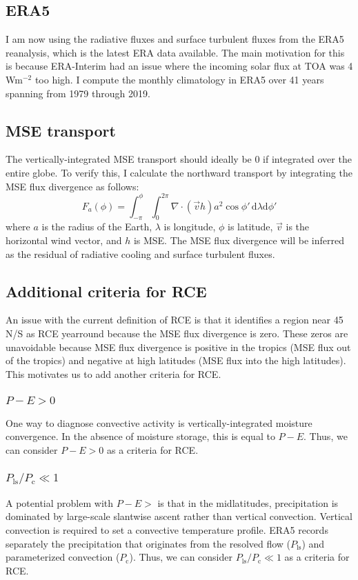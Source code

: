 \documentclass[11pt]{article}
\begin{document}
\subsection{ERA5}
\label{sec:org9002395}
I am now using the radiative fluxes and surface turbulent fluxes from the ERA5 reanalysis, which is the latest ERA data available. The main motivation for this is because ERA-Interim had an issue where the incoming solar flux at TOA was 4 Wm\(^{-2}\) too high. I compute the monthly climatology in ERA5 over 41 years spanning from 1979 through 2019.

\subsection{MSE transport}
\label{sec:org3eea186}
The vertically-integrated MSE transport should ideally be 0 if integrated over the entire globe. To verify this, I calculate the northward transport by integrating the MSE flux divergence as follows:
\begin{equation}
F_a(\phi) = \int_{-\pi}^{\phi}\int_{0}^{2\pi} \!\nabla\cdot(\vec{v}h)a^2\cos{\phi'} \, \mathrm{d}\lambda \mathrm{d}\phi'
\end{equation}
where \(a\) is the radius of the Earth, \(\lambda\) is longitude, \(\phi\) is latitude, \(\vec{v}\) is the horizontal wind vector, and \(h\) is MSE. The MSE flux divergence will be inferred as the residual of radiative cooling and surface turbulent fluxes.

\subsection{Additional criteria for RCE}
\label{sec:org8d810ee}
An issue with the current definition of RCE is that it identifies a region near 45 N/S as RCE yearround because the MSE flux divergence is zero. These zeros are unavoidable because MSE flux divergence is positive in the tropics (MSE flux out of the tropics) and negative at high latitudes (MSE flux into the high latitudes). This motivates us to add another criteria for RCE.
\subsubsection{\(P-E>0\)}
\label{sec:orgeb1a078}
One way to diagnose convective activity is vertically-integrated moisture convergence. In the absence of moisture storage, this is equal to \(P-E\). Thus, we can consider \(P-E>0\) as a criteria for RCE.
\subsubsection{\(P_{\mathrm{ls}}/P_{\mathrm{c}} \ll 1\)}
\label{sec:org8cf3576}
A potential problem with \(P-E>\) is that in the midlatitudes, precipitation is dominated by large-scale slantwise ascent rather than vertical convection. Vertical convection is required to set a convective temperature profile. ERA5 records separately the precipitation that originates from the resolved flow (\(P_{\mathrm{ls}}\)) and parameterized convection (\(P_\mathrm{c}\)). Thus, we can consider \(P_{\mathrm{ls}}/P_\mathrm{c} \ll 1\) as a criteria for RCE.
\end{document}
